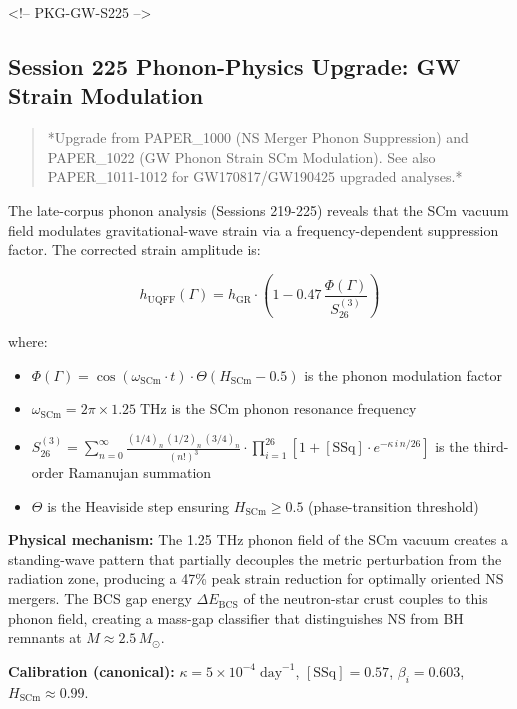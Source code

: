 \documentclass[12pt,a4paper]{article}
\begin{document}
<!-- PKG-GW-S225 -->

\subsection{Session 225 Phonon-Physics Upgrade: GW Strain Modulation}

\begin{quote}
*Upgrade from PAPER\_1000 (NS Merger Phonon Suppression) and PAPER\_1022
(GW Phonon Strain SCm Modulation). See also PAPER\_1011-1012 for
GW170817/GW190425 upgraded analyses.*
\end{quote}

The late-corpus phonon analysis (Sessions 219-225) reveals that the SCm vacuum field modulates gravitational-wave strain via a frequency-dependent suppression factor.  The corrected strain amplitude is:

\begin{equation}
h_{\text{UQFF}}(\Gamma) = h_{\text{GR}} \cdot \left(1 - 0.47\,\frac{\Phi(\Gamma)}{S_{26}^{(3)}}\right)
\end{equation}

where:

\begin{itemize}
  \item $\Phi(\Gamma) = \cos(\omega_{\text{SCm}} \cdot t) \cdot \Theta(H_{\text{SCm}} - 0.5)$ is the phonon modulation factor
  \item $\omega_{\text{SCm}} = 2\pi \times 1.25\;\text{THz}$ is the SCm phonon resonance frequency
  \item $S_{26}^{(3)} = \sum_{n=0}^{\infty} \frac{(1/4)_n\,(1/2)_n\,(3/4)_n}{(n!)^3} \cdot \prod_{i=1}^{26}\left[1 + [\text{SSq}]\cdot e^{-\kappa\,i\,n/26}\right]$ is the third-order Ramanujan summation
  \item $\Theta$ is the Heaviside step ensuring $H_{\text{SCm}} \geq 0.5$ (phase-transition threshold)
\end{itemize}

\textbf{Physical mechanism:} The 1.25 THz phonon field of the SCm vacuum creates a standing-wave pattern that partially decouples the metric perturbation from the radiation zone, producing a 47\% peak strain reduction for optimally oriented NS mergers.  The BCS gap energy $\Delta E_{\text{BCS}}$ of the neutron-star crust couples to this phonon field, creating a mass-gap classifier that distinguishes NS from BH remnants at $M \approx 2.5\,M_\odot$.

\textbf{Calibration (canonical):} $\kappa = 5 \times 10^{-4}\;\text{day}^{-1}$, $[\text{SSq}] = 0.57$, $\beta_i = 0.603$, $H_{\text{SCm}} \approx 0.99$.
\end{document}
